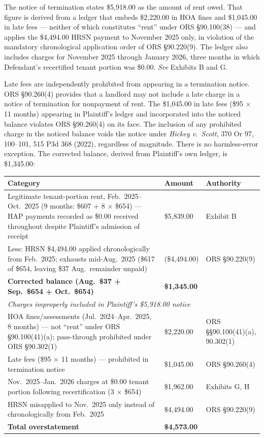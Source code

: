 \documentclass[12pt,letterpaper]{article}
\begin{document}
The notice of termination states \$5,918.00 as the amount of rent owed. That figure is derived from a ledger that embeds \$2,220.00 in HOA fines and \$1,045.00 in late fees --- neither of which constitutes ``rent'' under ORS \S90.100(38) --- and applies the \$4,494.00 HRSN payment to November 2025 only, in violation of the mandatory chronological application order of ORS \S90.220(9). The ledger also includes charges for November 2025 through January 2026, three months in which Defendant's recertified tenant portion was \$0.00. \textit{See} Exhibits B and G.

Late fees are independently prohibited from appearing in a termination notice. ORS \S90.260(4) provides that a landlord may not include a late charge in a notice of termination for nonpayment of rent. The \$1,045.00 in late fees (\$95 $\times$ 11 months) appearing in Plaintiff's ledger and incorporated into the noticed balance violates ORS \S90.260(4) on its face. The inclusion of any prohibited charge in the noticed balance voids the notice under \textit{Hickey v.\ Scott}, 370 Or 97, 100--101, 515 P3d 368 (2022), regardless of magnitude. There is no harmless-error exception. The corrected balance, derived from Plaintiff's own ledger, is \$1,345.00:

\vspace{6pt}
\begin{singlespace}
\noindent\begin{longtable}{|p{3.2in}|p{0.9in}|p{1.5in}|}
\hline
\textbf{Category} & \textbf{Amount} & \textbf{Authority} \\
\hline
Legitimate tenant-portion rent, Feb.\ 2025--Oct.\ 2025 (9 months: \$607 + 8 $\times$ \$654) --- HAP payments recorded as \$0.00 received throughout despite Plaintiff's admission of receipt & \$5,839.00 & Exhibit B \\
\hline
Less: HRSN \$4,494.00 applied chronologically from Feb.\ 2025; exhausts mid-Aug.\ 2025 (\$617 of \$654, leaving \$37 Aug.\ remainder unpaid) & (\$4,494.00) & ORS \S90.220(9) \\
\hline
\textbf{Corrected balance (Aug.\ \$37 + Sep.\ \$654 + Oct.\ \$654)} & \textbf{\$1,345.00} & \\
\hline
\multicolumn{3}{|l|}{\textit{Charges improperly included in Plaintiff's \$5,918.00 notice}} \\
\hline
HOA fines/assessments (Jul.\ 2024--Apr.\ 2025, 8 months) --- not ``rent'' under ORS \S90.100(41)(a); pass-through prohibited under ORS \S90.302(1) & \$2,220.00 & ORS \S\S90.100(41)(a), 90.302(1) \\
\hline
Late fees (\$95 $\times$ 11 months) --- prohibited in termination notice & \$1,045.00 & ORS \S90.260(4) \\
\hline
Nov.\ 2025--Jan.\ 2026 charges at \$0.00 tenant portion following recertification (3 $\times$ \$654) & \$1,962.00 & Exhibits G, H \\
\hline
HRSN misapplied to Nov.\ 2025 only instead of chronologically from Feb.\ 2025 & \$4,494.00 & ORS \S90.220(9) \\
\hline
\textbf{Total overstatement} & \textbf{\$4,573.00} & \\
\hline
\end{longtable}
\end{singlespace}
\end{document}
